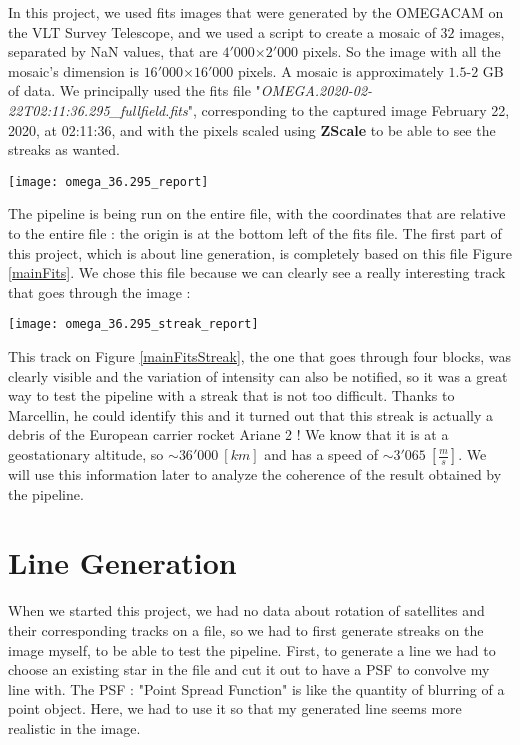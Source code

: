 \documentclass[a4paper,12pt,oneside]{report}
\begin{document}
In this project, we used fits images that were generated by the OMEGACAM on the VLT Survey Telescope, and we used a script to create a 
mosaic of $32$ images, separated by NaN values, that are $4'000$$\times$$2'000$ pixels. So the image with all the mosaic's dimension is $16'000$$\times$$16'000$ pixels. 
A mosaic is approximately $1.5$-$2$ GB of data. 
\newline
We principally used the fits file "\emph{OMEGA.2020-02-22T02:11:36.295\_fullfield.fits}", corresponding to the
captured image February 22, 2020, at 02:11:36, and with the pixels scaled using \textbf{ZScale} to be able to see the streaks as wanted.
\newline
\begin{center}
    \texttt{[image: omega\_36.295\_report]}
    \label{mainFits}
\end{center}
The pipeline \cite{intensityStreakRepository} is being run on the entire file, with the coordinates that are relative to the entire file : the origin is at the bottom left of
the fits file. The first part of this project, which is about line generation, is completely based on this file Figure \ref{mainFits}. We chose
this file because we can clearly see a really interesting track that goes through the image :
\begin{center}
    \texttt{[image: omega\_36.295\_streak\_report]}
    \label{mainFitsStreak}
\end{center}
This track on Figure \ref{mainFitsStreak}, the one that goes through four blocks, was clearly visible and the variation of intensity can also be notified, 
so it was a great way to test the pipeline with a streak that is not too difficult. Thanks to Marcellin, he could identify this and it turned out that 
this streak is actually a debris of the European carrier rocket Ariane 2 ! We know that it is at a geostationary altitude, 
so $\sim 36'000\ [km]$ and has a speed of $\sim 3'065\ [\frac{m}{s}]$. We will use this information later to analyze the coherence 
of the result obtained by the pipeline.

\chapter{Line Generation}

When we started this project, we had no data about rotation of satellites and their corresponding tracks on a file, so we had to first 
generate streaks on the image myself, to be able to test the pipeline. First, to generate a line we had to choose an existing star in the file
and cut it out to have a PSF to convolve my line with. The PSF : "Point Spread Function" is like the quantity of blurring of a point object.
Here, we had to use it so that my generated line seems more realistic in the image. 
\end{document}
